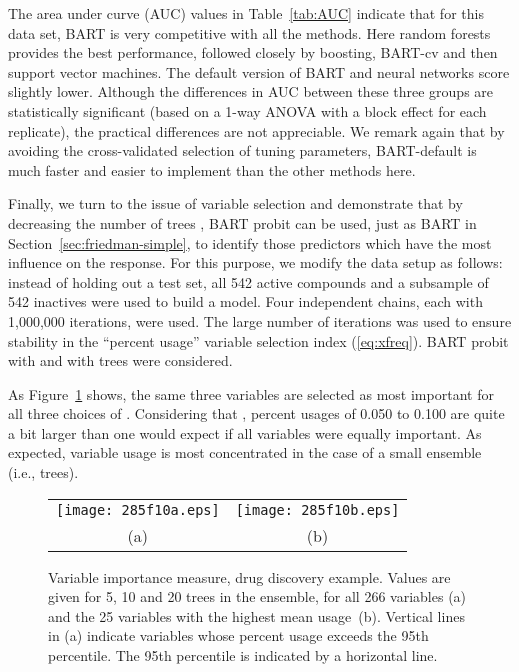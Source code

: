 \documentclass[aoas,nameyear,dvips]{arximspdf}
\begin{document}
The area under curve (AUC) values in Table~\ref{tab:AUC} indicate that for
this data set, BART is very competitive with all the methods.  Here
random forests provides the best performance, followed closely by
boosting, BART-cv and then support vector machines.  The default version of BART
and neural networks score slightly lower.  Although the differences in AUC between
these three groups are statistically significant (based on a 1-way ANOVA with a
block effect for each replicate), the practical differences are not appreciable.
We remark again that by avoiding the cross-validated selection of tuning
parameters, BART-default is much faster and easier to implement than the other methods here.



Finally, we turn to the issue of variable selection and demonstrate
that by decreasing the number of trees , BART probit can be used,
just as BART in Section~\ref{sec:friedman-simple}, to identify those predictors which have
the most influence on the \mbox{response}.  For this purpose, we modify the
data setup as follows: instead of holding out a test set, all 542 active
compounds and a subsample of 542 inactives were used to build a model.
Four independent chains, each with 1,000,000 iterations, were used.  The
large number of iterations was used to ensure stability in the
``percent usage'' variable selection index (\ref{eq:xfreq}).
BART probit with  and
with  trees were considered.

As Figure~\ref{fig:usage} shows,
the same three variables are selected as most
important for all three choices of .
Considering that , percent usages of 0.050 to
0.100 are quite a bit larger than one would expect if all variables were
equally important.  As expected, variable usage is most concentrated in the
case of a small ensemble (i.e.,  trees).

\begin{figure}
\begin{tabular}{@{}cc@{}}

\texttt{[image: 285f10a.eps]}
&\texttt{[image: 285f10b.eps]}\\
(a)&(b)
\end{tabular}
 \caption{Variable importance measure, drug discovery example.  Values are
given for 5, 10 and 20 trees in the ensemble, for all 266 variables \textup{(a)} and
the 25 variables with the highest mean usage~\textup{(b)}.  Vertical lines in \textup{(a)}
indicate variables whose percent usage exceeds the 95th percentile.  The
95th percentile is indicated by a horizontal line.}\label{fig:usage}
\end{figure}
\end{document}

